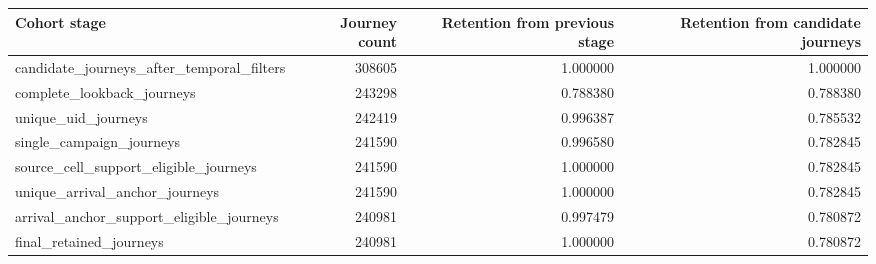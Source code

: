 \begin{tabular}{lrrr}
\toprule
Cohort stage & Journey count & Retention from previous stage & Retention from candidate journeys \\
\midrule
candidate\_journeys\_after\_temporal\_filters & 308605 & 1.000000 & 1.000000 \\
complete\_lookback\_journeys & 243298 & 0.788380 & 0.788380 \\
unique\_uid\_journeys & 242419 & 0.996387 & 0.785532 \\
single\_campaign\_journeys & 241590 & 0.996580 & 0.782845 \\
source\_cell\_support\_eligible\_journeys & 241590 & 1.000000 & 0.782845 \\
unique\_arrival\_anchor\_journeys & 241590 & 1.000000 & 0.782845 \\
arrival\_anchor\_support\_eligible\_journeys & 240981 & 0.997479 & 0.780872 \\
final\_retained\_journeys & 240981 & 1.000000 & 0.780872 \\
\bottomrule
\end{tabular}
